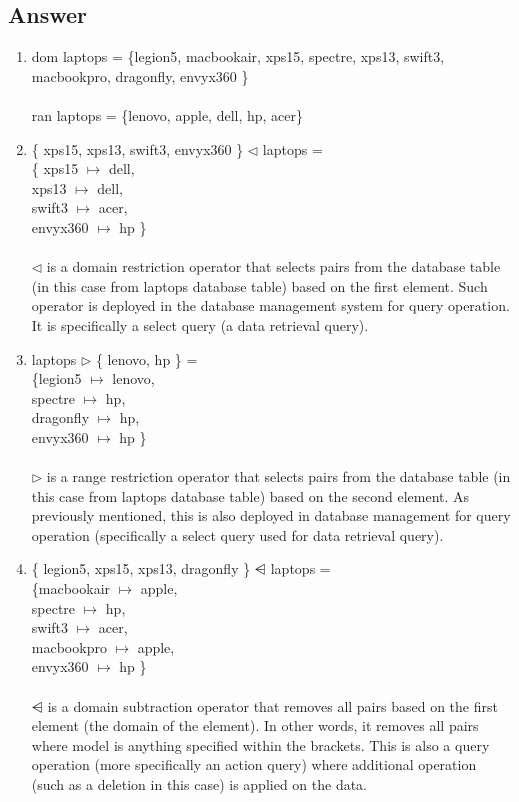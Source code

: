 \subsection{Answer}
\begin{enumerate}

\item dom laptops = \{legion5, macbookair, xps15, spectre, xps13, swift3, macbookpro, dragonfly, envyx360 \}
\\ \\
ran laptops = \{lenovo, apple, dell, hp, acer\} \\

\item \{ xps15, xps13, swift3, envyx360 \}  $\lhd$ laptops  = \\
\{ xps15 $\mapsto$ dell, \\
xps13 $\mapsto$ dell, \\
swift3 $\mapsto$ acer, \\
envyx360 $\mapsto$ hp \}
\\ \\
$\lhd$ is a domain restriction operator that selects pairs from the database table (in this case from laptops database table) based on the first element. Such operator is deployed in the database management system for query operation. It is specifically a select query (a data retrieval query).\\
 
\item laptops $\rhd$ \{ lenovo, hp \} = \\
\{legion5 $\mapsto$ lenovo, \\
spectre $\mapsto$ hp, \\
dragonfly $\mapsto$ hp, \\
envyx360 $\mapsto$ hp \}
\\ \\
$\rhd$ is a range restriction operator that selects pairs from the database table (in this case from laptops database table) based on the second element. As previously mentioned, this is also deployed in database management for query operation (specifically a select query used for data retrieval query). \\

\item \{ legion5, xps15, xps13, dragonfly \} $\ndres$  laptops = \\
\{macbookair $\mapsto$ apple, \\
spectre $\mapsto$ hp, \\
swift3 $\mapsto$ acer, \\
macbookpro $\mapsto$ apple, \\
envyx360 $\mapsto$ hp \}
\\ \\
$\ndres$ is a domain subtraction operator that removes all pairs based on the first element (the domain of the element). In other words, it removes all pairs where model is anything specified within the brackets. This is also a query operation (more specifically an action query) where additional operation (such as a deletion in this case) is applied on  the data.\\


\end{enumerate}
